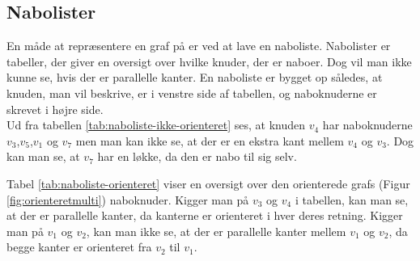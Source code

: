 \subsection{Nabolister}
En måde at repræsentere en graf på er ved at lave en naboliste. Nabolister er tabeller, der giver en oversigt over hvilke knuder, der er naboer. Dog vil man ikke kunne se, hvis der er parallelle kanter. En naboliste er bygget op således, at knuden, man vil beskrive, er i venstre side af tabellen, og naboknuderne er skrevet i højre side. \\




Ud fra tabellen \ref{tab:naboliste-ikke-orienteret} ses, at knuden $v_4$ har naboknuderne $v_3$,$v_5$,$v_1$ og $v_7$ men man kan ikke se, at der er en ekstra kant mellem $v_4$ og $v_3$. Dog kan man se, at $v_7$ har en løkke, da den er nabo til sig selv.


Tabel \ref{tab:naboliste-orienteret} viser en oversigt over den orienterede grafs (Figur \ref{fig:orienteretmulti}) naboknuder. Kigger man på $v_3$ og $v_4$ i tabellen, kan man se, at der er parallelle kanter, da kanterne er orienteret i hver deres retning. Kigger man på $v_1$ og $v_2$, kan man ikke se, at der er parallelle kanter mellem $v_1$ og $v_2$, da begge kanter er orienteret fra $v_2$ til $v_1$.